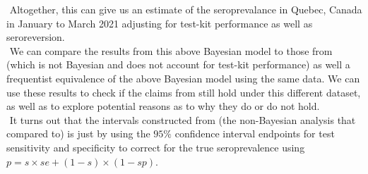 \newline $ $
Altogether, this can give us an estimate of the seroprevalance in Quebec, Canada in January to March 2021 adjusting for test-kit performance as well as seroreversion.\\
\newline $ $
We can compare the results from this above Bayesian model to those from \cite{lewin2022seroprevalence} (which is not Bayesian and does not account for test-kit performance) as well a frequentist equivalence of the above Bayesian model using the same data. We can use these results to check if the claims from \cite{lewin2022seroprevalence} still hold under this different dataset, as well as to explore potential reasons as to why they do or do not hold.\\
\newline $ $
It turns out that the intervals constructed from \cite{rosenberg2020cumulative} (the non-Bayesian analysis that \cite{meyer2022adjusting} compared to) is just by using the $95\%$ confidence interval endpoints for test sensitivity and specificity to correct for the true seroprevalence using $p = s \times se + (1-s) \times (1-sp)$.

